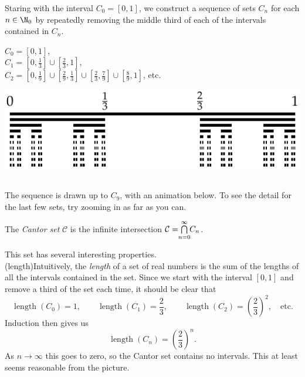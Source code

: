 \noindent Staring with the interval $C_0=[0,1]$, we construct a sequence of sets $C_n$ for each $n\in\N_0$ by repeatedly removing the middle third of each of the intervals contained in $C_n$.

\begin{minipage}{0.40\textwidth}
$C_0=[0,1]$,\\[4pt]
$C_1=[0,\frac 13]\cup [\frac 23,1]$,\\[4pt]
$C_2=[0,\frac 19]\cup [\frac 29,\frac 13]\cup [\frac 23,\frac 79]\cup [\frac 89,1]$, etc.
\end{minipage}
\begin{minipage}{0.55\textwidth}
\includegraphics[width=\textwidth]{setsii-02-cantor}
\end{minipage}\\

\noindent The sequence is drawn up to $C_{9}$, with an animation below. To see the detail for the last few sets, try zooming in as far as you can.\vspace{-5pt}
\begin{center}
\end{center}\vspace{-8pt}

\begin{defn}
The \emph{Cantor set} $\mathcal C$ is the infinite intersection $\mathcal C=\negthickspace\bigcap\limits_{n=0}^\infty\negthickspace C_n$.
\end{defn}

\noindent This set has several interesting properties.\\

 (length)\quad Intuitively, the \emph{length} of a set of real numbers is the sum of the lengths of all the intervals contained in the set. Since we start with the interval $[0,1]$ and remove a third of the set each time, it should be clear that
\[\operatorname{length}(C_0)=1,\qquad \operatorname{length}(C_1)=\frac 23,\qquad\operatorname{length}(C_2)=\left(\frac 23\right)^2,\quad\text{etc.}\]
Induction then gives us
\[\operatorname{length}(C_n)=\left(\frac 23\right)^n.\]
As $n\to\infty$ this goes to zero, so the Cantor set contains no intervals. This at least seems reasonable from the picture.\\


